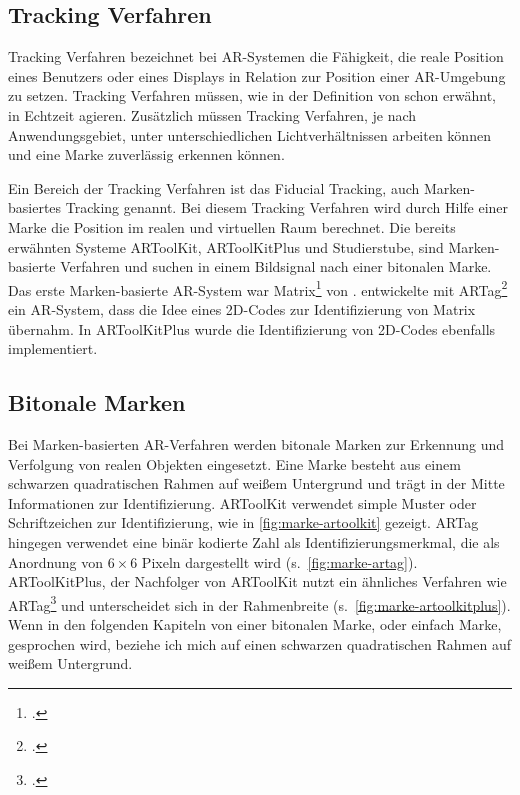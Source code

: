 \subsection{Tracking Verfahren} %
\label{sec:tracking_verfahren}
Tracking Verfahren bezeichnet bei \gls{AR}-Systemen die Fähigkeit, die reale Position eines Benutzers oder eines
 Displays in Relation zur Position einer \gls{AR}-Umgebung zu setzen. Tracking Verfahren müssen, wie in der Definition
 von \citeauthor{azuma97} schon erwähnt, in Echtzeit agieren. Zusätzlich müssen Tracking Verfahren, je nach
 Anwendungsgebiet, unter unterschiedlichen Lichtverhältnissen arbeiten können und eine Marke zuverlässig erkennen
 können.

Ein Bereich der Tracking Verfahren ist das Fiducial Tracking, auch Marken-basiertes Tracking genannt. Bei diesem
 Tracking Verfahren wird durch Hilfe einer Marke die Position im realen und virtuellen Raum berechnet. Die bereits
 erwähnten Systeme ARToolKit, ARToolKitPlus und Studierstube, sind Marken-basierte Verfahren und suchen in einem
 Bildsignal nach einer bitonalen Marke. Das erste Marken-basierte \gls{AR}-System war
 Matrix\footcite{rekimoto1998matrix} von \citeauthor{rekimoto1998matrix}. \citeauthor{fiala2004artaga} entwickelte mit
 ARTag\footcite{fiala2004artaga} ein \gls{AR}-System, dass die Idee eines 2D-Codes zur Identifizierung von Matrix
 übernahm. In ARToolKitPlus wurde die Identifizierung von 2D-Codes ebenfalls implementiert.

\subsection{Bitonale Marken} %
\label{sub:bitonalemarken}
Bei Marken-basierten \gls{AR}-Verfahren werden bitonale Marken zur Erkennung und Verfolgung von realen Objekten
 eingesetzt. Eine Marke besteht aus einem schwarzen quadratischen Rahmen auf weißem Untergrund und trägt in der Mitte
 Informationen zur Identifizierung. ARToolKit verwendet simple Muster oder Schriftzeichen zur Identifizierung, wie in
 \autoref{fig:marke-artoolkit} gezeigt. ARTag hingegen verwendet eine binär kodierte Zahl als Identifizierungsmerkmal,
 die als Anordnung von $6 \times 6$ Pixeln dargestellt wird (s.~\autoref{fig:marke-artag}). ARToolKitPlus, der
 Nachfolger von ARToolKit nutzt ein ähnliches Verfahren wie ARTag\footcite[Vgl.][S.~142]{wagner07b} und unterscheidet
 sich in der Rahmenbreite (s.~\autoref{fig:marke-artoolkitplus}). Wenn in den folgenden Kapiteln von einer bitonalen
 Marke, oder einfach Marke, gesprochen wird, beziehe ich mich auf einen schwarzen quadratischen Rahmen auf weißem
 Untergrund.

